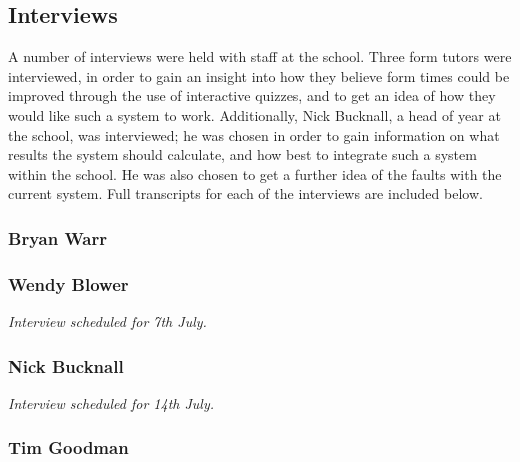 \subsection{Interviews}

A number of interviews were held with staff at the school. Three form tutors were interviewed, in order to gain an insight into how they believe form times could be improved through the use of interactive quizzes, and to get an idea of how they would like such a system to work. Additionally, Nick Bucknall, a head of year at the school, was interviewed; he was chosen in order to gain information on what results the system should calculate, and how best to integrate such a system within the school. He was also chosen to get a further idea of the faults with the current system. Full transcripts for each of the interviews are included below.

\subsubsection{Bryan Warr}


\subsubsection{Wendy Blower}

\textit{Interview scheduled for 7th July.}

\subsubsection{Nick Bucknall}

\textit{Interview scheduled for 14th July.}

\subsubsection{Tim Goodman}